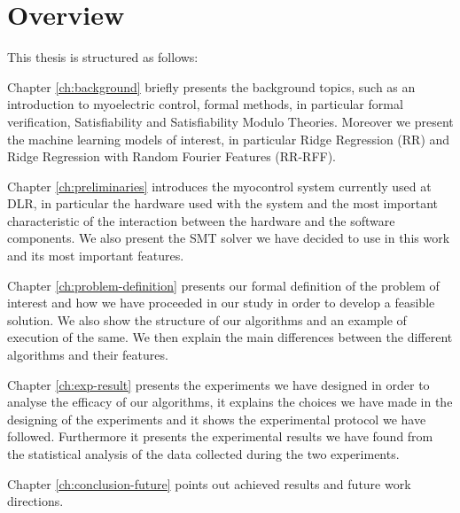 \section{Overview}\label{sec:overview}
This thesis is structured as follows:

Chapter \ref{ch:background} briefly presents the background topics, such as an introduction to myoelectric control, formal methods, in particular formal verification, Satisfiability and Satisfiability Modulo Theories. Moreover we present the machine learning models of interest, in particular Ridge Regression (RR) and Ridge Regression with Random Fourier Features (RR-RFF).

Chapter \ref{ch:preliminaries} introduces the myocontrol system currently used at DLR, in particular the hardware used with the system and the most important characteristic of the interaction between the hardware and the software components. We also present the SMT solver we have decided to use in this work and its most important features.

Chapter \ref{ch:problem-definition} presents our formal definition of the problem of interest and how we have proceeded in our study in order to develop a feasible solution. We also show the structure of our algorithms and an example of execution of the same. We then explain the main differences between the different algorithms and their features.

Chapter \ref{ch:exp-result} presents the experiments we have designed in order to analyse the efficacy of our algorithms, it explains the choices we have made in the designing of the experiments and it shows the experimental protocol we have followed. Furthermore it presents the experimental results we have found from the statistical analysis of the data collected during the two experiments. 

Chapter \ref{ch:conclusion-future}  points out achieved results and future work directions.